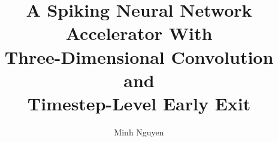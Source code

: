 \documentclass[journal]{IEEEtran}
\begin{document}
\title{A Spiking Neural Network Accelerator With\\[2pt]
Three-Dimensional Convolution and\\[2pt]
Timestep-Level Early Exit}

\author{Minh Nguyen}

\maketitle


\end{document}
